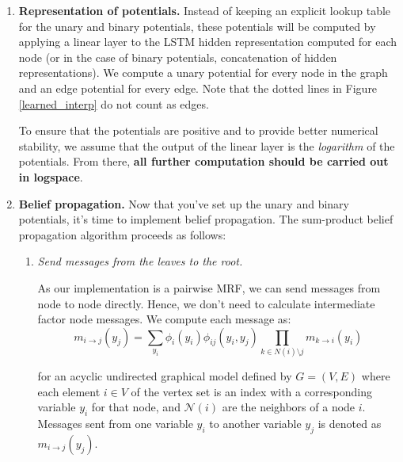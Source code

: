 \documentclass[11pt,addpoints,answers]{exam}
\numberwithin{equation}{section} %
\numberwithin{figure}{section} %
\numberwithin{table}{section} %
\newcommand{\Nc}{\mathcal{N}}
\begin{document}
\begin{enumerate}
    \item \textbf{Representation of potentials.} Instead of keeping an explicit lookup table for the unary and binary potentials, these potentials will be computed by applying a linear layer to the LSTM hidden representation computed for each node (or in the case of binary potentials, concatenation of hidden representations). We compute a unary potential for every node in the graph and an edge potential for every edge. Note that the dotted lines in Figure \ref{learned_interp} do not count as edges. 

    To ensure that the potentials are positive and to provide better numerical stability, we assume that the output of the linear layer is the \emph{logarithm} of the potentials. From there, \textbf{all further computation should be carried out in logspace}.
    
    \item \textbf{Belief propagation.} Now that you've set up the unary and binary potentials, it's time to implement belief propagation. The sum-product belief propagation algorithm proceeds as follows:
    \begin{enumerate}
        \item \emph{Send messages from the leaves to the root.}
        
        As our implementation is a pairwise MRF, we can send messages from node to node directly. Hence, we don't need to calculate intermediate factor node messages. We compute each message as:
    $$m_{i \rightarrow j}(y_j) = \sum_{y_i} \phi_i(y_i) \phi_{ij}(y_i, y_j) \prod_{k \in N(i) \setminus j} m_{k \rightarrow i}(y_i)$$
        
        for an acyclic undirected graphical model defined by $G = (V, E)$ where each element $i \in V$ of the vertex set is an index with a corresponding variable $y_i$ for that node, and $\Nc(i)$ are the neighbors of a node $i$. Messages sent from one variable $y_i$ to another variable $y_j$ is denoted as $m_{i \rightarrow j}(y_j)$.
        

\end{enumerate}
\end{enumerate}
\end{document}
